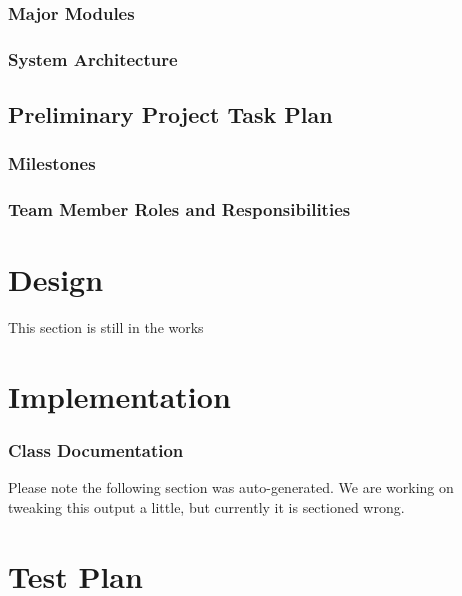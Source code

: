 \documentclass{book}
\begin{document}
\subsection{Major Modules}

\subsection{System Architecture}


\section{Preliminary Project Task Plan}


\subsection{Milestones}

\subsection{Team Member Roles and Responsibilities}



\chapter*{Design}

This section is still in the works

\chapter*{Implementation}

\subsection{Class Documentation}

Please note the following section was auto-generated. We are working on tweaking this output a little, but currently it is sectioned wrong.

%
%
%
%
%
%
%
%
%
%

\chapter*{Test Plan}
\end{document}
